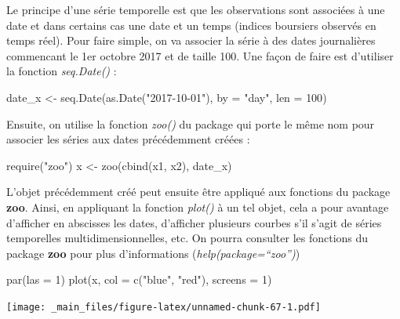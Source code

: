 \documentclass[
]{book}
\newenvironment{Shaded}{\begin{snugshade}}{\end{snugshade}}
\newcommand{\AttributeTok}[1]{\textcolor[rgb]{0.77,0.63,0.00}{#1}}
\newcommand{\DecValTok}[1]{\textcolor[rgb]{0.00,0.00,0.81}{#1}}
\newcommand{\FunctionTok}[1]{\textcolor[rgb]{0.00,0.00,0.00}{#1}}
\newcommand{\NormalTok}[1]{#1}
\newcommand{\OtherTok}[1]{\textcolor[rgb]{0.56,0.35,0.01}{#1}}
\newcommand{\StringTok}[1]{\textcolor[rgb]{0.31,0.60,0.02}{#1}}
\theoremstyle{definition}
\theoremstyle{definition}
\theoremstyle{definition}
\theoremstyle{definition}
\theoremstyle{remark}
\begin{document}
Le principe d'une série temporelle est que les observations sont associées à une date et dans certains cas une date et un temps (indices boursiers observés en temps réel). Pour faire simple, on va associer la série à des dates journalières commencant le 1er octobre 2017 et de taille 100. Une façon de faire est d'utiliser la fonction \emph{seq.Date()} :

\begin{Shaded}
\begin{Highlighting}[]
\NormalTok{date\_x }\OtherTok{\textless{}{-}} \FunctionTok{seq.Date}\NormalTok{(}\FunctionTok{as.Date}\NormalTok{(}\StringTok{"2017{-}10{-}01"}\NormalTok{), }\AttributeTok{by =} \StringTok{"day"}\NormalTok{, }\AttributeTok{len =} \DecValTok{100}\NormalTok{)}
\end{Highlighting}
\end{Shaded}

Ensuite, on utilise la fonction \emph{zoo()} du package qui porte le même nom pour associer les séries aux dates précédemment créées :

\begin{Shaded}
\begin{Highlighting}[]
\FunctionTok{require}\NormalTok{(}\StringTok{"zoo"}\NormalTok{)}
\NormalTok{x }\OtherTok{\textless{}{-}} \FunctionTok{zoo}\NormalTok{(}\FunctionTok{cbind}\NormalTok{(x1, x2), date\_x)}
\end{Highlighting}
\end{Shaded}

L'objet précédemment créé peut ensuite être appliqué aux fonctions du package \textbf{zoo}. Ainsi, en appliquant la fonction \emph{plot()} à un tel objet, cela a pour avantage d'afficher en abscisses les dates, d'afficher plusieurs courbes s'il s'agit de séries temporelles multidimensionnelles, etc. On pourra consulter les fonctions du package \textbf{zoo} pour plus d'informations (\emph{help(package=``zoo'')})

\begin{Shaded}
\begin{Highlighting}[]
\FunctionTok{par}\NormalTok{(}\AttributeTok{las =} \DecValTok{1}\NormalTok{)}
\FunctionTok{plot}\NormalTok{(x, }\AttributeTok{col =} \FunctionTok{c}\NormalTok{(}\StringTok{"blue"}\NormalTok{, }\StringTok{"red"}\NormalTok{), }\AttributeTok{screens =} \DecValTok{1}\NormalTok{)}
\end{Highlighting}
\end{Shaded}

\texttt{[image: \_main\_files/figure-latex/unnamed-chunk-67-1.pdf]}
\end{document}
